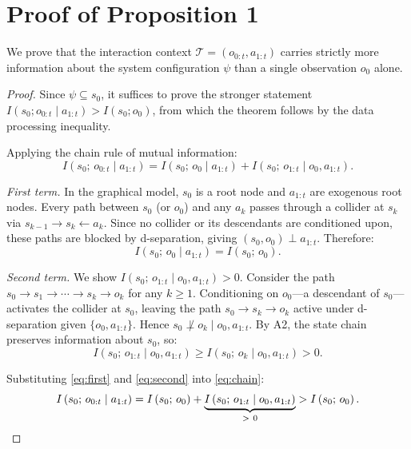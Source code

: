 


\section{Proof of Proposition 1}
\label{appendix:proof}

We prove that the interaction context $\mathcal{T} = \left(o_{0:t}, a_{1:t}\right)$ 
carries strictly more information about the system configuration $\psi$ than 
a single observation $o_0$ alone.

\begin{proof}
Since $\psi \subseteq s_0$, it suffices to prove the stronger statement 
$I\left(s_0; o_{0:t} \mid a_{1:t}\right) > I\left(s_0; o_0\right)$, from which the theorem 
follows by the data processing inequality.

Applying the chain rule of mutual information:
\begin{equation}
I\left(s_0;\, o_{0:t} \mid a_{1:t}\right) = I\left(s_0;\, o_0 \mid a_{1:t}\right) + 
I\left(s_0;\, o_{1:t} \mid o_0, a_{1:t}\right).
\label{eq:chain}
\end{equation}

\textit{First term.} In the graphical model, $s_0$ is a root node and 
$a_{1:t}$ are exogenous root nodes. Every path between $s_0$ (or $o_0$) 
and any $a_k$ passes through a collider at $s_k$ via $s_{k-1} \to s_k 
\leftarrow a_k$. Since no collider or its descendants are conditioned upon, 
these paths are blocked by d-separation, giving $\left(s_0, o_0\right) \perp a_{1:t}$. 
Therefore:
\begin{equation}
I\left(s_0;\, o_0 \mid a_{1:t}\right) = I\left(s_0;\, o_0\right).
\label{eq:first}
\end{equation}

\textit{Second term.} We show $I\left(s_0;\, o_{1:t} \mid o_0, a_{1:t}\right) > 0$. 
Consider the path $s_0 \to s_1 \to \cdots \to s_k \to o_k$ for any 
$k \geq 1$. Conditioning on $o_0$—a descendant of $s_0$—activates the 
collider at $s_0$, leaving the path $s_0 \to s_k \to o_k$ active under 
d-separation given $\{o_0, a_{1:t}\}$. Hence $s_0 \not\perp o_k \mid 
o_0, a_{1:t}$. By A2, the state chain preserves information about $s_0$, 
so:
\begin{equation}
I\left(s_0;\, o_{1:t} \mid o_0, a_{1:t}\right) \geq I\left(s_0;\, o_k \mid o_0, a_{1:t}\right) 
> 0.
\label{eq:second}
\end{equation}

Substituting \eqref{eq:first} and \eqref{eq:second} into \eqref{eq:chain}:
\begin{equation}
I\left(s_0;\, o_{0:t} \mid a_{1:t}\right) = I\left(s_0;\, o_0\right) + 
\underbrace{I\left(s_0;\, o_{1:t} \mid o_0, a_{1:t}\right)}_{>\ 0} > I\left(s_0;\, o_0\right).
\qedhere
\end{equation}
\end{proof}






